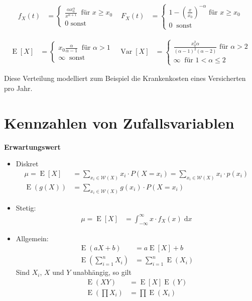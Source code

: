 \documentclass[25pt]{sciposter}
\newcommand{\Var}{\operatorname{Var}}
\newcommand{\E}{\operatorname{E}}
\newcommand{\rmd}{\mathrm{d}}
\newenvironment{method}[1]{\begin{mdframed}[backgroundcolor=blue!10,innertopmargin=15pt, innerbottommargin=15pt,nobreak=true]
		\textbf{#1 }
	}
	{ 
	\end{mdframed}
}
\begin{document}
\begin{multicols}{3}
\begin{align*}
f_X(t) &= \begin{cases}
\frac{\alpha x_0 ^\alpha}{x^{\alpha+1}} \ \text{ für } x \geq x_0 \\
0 \text{ sonst}
\end{cases}
& 
F_X(t) &= \begin{cases}
1-\left(\frac{x}{x_0}\right)^{-\alpha} \text{ für } x \geq x_0\\
0 \ \text{ sonst}
\end{cases}
\end{align*}

\begin{align*}
\E[X] &= \begin{cases}
x_0 \frac{\alpha}{\alpha - 1}\ \text{ für } \alpha > 1 \\
\infty \ \text{ sonst}
\end{cases}
& 
\Var[X] &= \begin{cases}
\frac{x_0 ^2 \alpha}{(\alpha-1)^2(\alpha-2)} \text{ für } \alpha > 2\\
\infty \ \text{ für } 1 < \alpha \leq 2
\end{cases}
\end{align*}

Diese Verteilung modelliert zum Beispiel die Krankenkosten eines Versicherten pro Jahr.


\section{Kennzahlen von Zufallsvariablen}


\begin{method}{Erwartungswert}
	\begin{itemize}
		\item Diskret
		\begin{align*}
	\mu = \E[X] &= \sum_{x_i \in \mathcal{W}(X)} x_i \cdot P(X=x_i) = \sum_{x_i \in \mathcal{W}(X)} x_i \cdot p(x_i) \\
	\E(g(X)) &= \sum_{x_i \in \mathcal{W}(X)} g(x_i) \cdot P(X=x_i)
	\end{align*}
		\item Stetig:
\begin{align*}
\mu = \E[X] &= \int_{-\infty}^{\infty} x \cdot f_X(x) \; \rmd x
\end{align*}
		
		\item Allgemein:
		\begin{align*}
	\E(aX+b) &= a\E[X] + b\\
	\E \left( \sum_{i=1}^n X_i \right) &= \sum_{i=1}^n \E(X_i)
		\end{align*}	
		Sind $X_i$, $X$ und $Y$ unabhängig, so gilt
		\begin{align*}
		\E(XY) &= \E[X]\E(Y)\\
		\E \left( \prod X_i \right) &= \prod \E(X_i)\\
		\end{align*}
		

\end{itemize}
\end{method}
\end{multicols}
\end{document}
